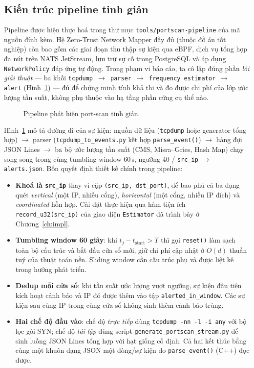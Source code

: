 \subsection{Kiến trúc pipeline tinh giản}
\label{sec:portscan-pipeline}

Pipeline được hiện thực hoá trong thư mục \texttt{tools/portscan-pipeline} của mã nguồn đính kèm. Hệ Zero-Trust Network Mapper đầy đủ (thuộc đồ án tốt nghiệp) còn bao gồm các giai đoạn thu thập sự kiện qua eBPF, dịch vụ tổng hợp đa nút trên NATS JetStream, lưu trữ sự cố trong PostgreSQL và áp dụng \texttt{NetworkPolicy} đáp ứng tự động. Trong phạm vi báo cáo, ta cô lập đúng phần \textit{lõi giải thuật} --- ba khối \texttt{tcpdump $\rightarrow$ parser $\rightarrow$ frequency estimator $\rightarrow$ alert} (Hình~\ref{fig:portscan-pipeline}) --- đủ để chứng minh tính khả thi và đo được chi phí của lớp ước lượng tần suất, không phụ thuộc vào hạ tầng phần cứng cụ thể nào.

\begin{figure}[H]
  \centering
  
  \caption{Pipeline phát hiện port-scan tinh giản.}
  \label{fig:portscan-pipeline}
\end{figure}

\noindent Hình~\ref{fig:portscan-pipeline} mô tả đường đi của sự kiện: nguồn dữ liệu (\texttt{tcpdump} hoặc generator tổng hợp) $\rightarrow$ parser (\texttt{tcpdump\_to\_events.py} kết hợp \texttt{parse\_event()}) $\rightarrow$ hàng đợi JSON Lines $\rightarrow$ ba bộ ước lượng tần suất (CMS, Misra--Gries, Hash Map) chạy song song trong cùng tumbling window 60\,s, ngưỡng 40 / \texttt{src\_ip} $\rightarrow$ \texttt{alerts.json}. Bốn quyết định thiết kế chính trong pipeline:

\begin{itemize}
  \item \textbf{Khoá là \texttt{src\_ip}} thay vì cặp \texttt{(src\_ip, dst\_port)}, để bao phủ cả ba dạng quét \textit{vertical} (một IP, nhiều cổng), \textit{horizontal} (một cổng, nhiều IP đích) và \textit{coordinated} hỗn hợp. Cài đặt thực hiện qua hàm tiện ích \texttt{record\_u32(src\_ip)} của giao diện \texttt{Estimator} đã trình bày ở Chương~\ref{ch:impl}.
  \item \textbf{Tumbling window 60 giây}: khi $t_j - t_{\text{start}} > T$ thì gọi \texttt{reset()} làm sạch toàn bộ cấu trúc và bắt đầu cửa sổ mới, giữ chi phí cập nhật ở $O(d)$ thuần tuý của thuật toán nền. Sliding window cần cấu trúc phụ và được liệt kê trong hướng phát triển.
  \item \textbf{Dedup mỗi cửa sổ}: khi tần suất ước lượng vượt ngưỡng, sự kiện đầu tiên kích hoạt cảnh báo và IP đó được thêm vào tập \texttt{alerted\_in\_window}. Các sự kiện sau cùng IP trong cùng cửa sổ không sinh thêm cảnh báo trùng.
  \item \textbf{Hai chế độ đầu vào}: chế độ \textit{trực tiếp} dùng \texttt{tcpdump -nn -l -i any} với bộ lọc gói SYN; chế độ \textit{tái lập} dùng script \texttt{generate\_portscan\_stream.py} để sinh luồng JSON Lines tổng hợp với hạt giống cố định. Cả hai kết thúc bằng cùng một khuôn dạng JSON một dòng/sự kiện do \texttt{parse\_event()} (C++) đọc được.
\end{itemize}

